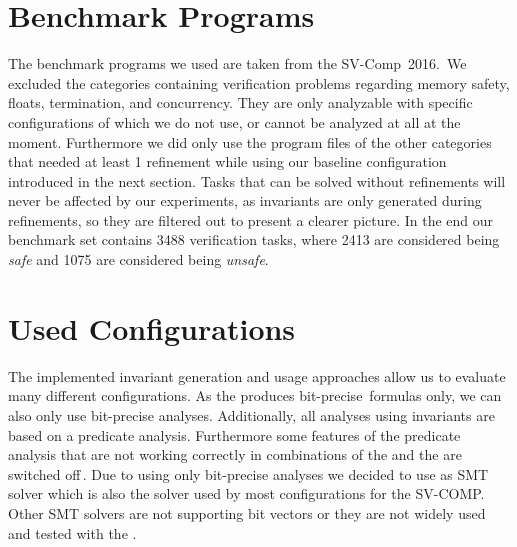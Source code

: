 \section{Benchmark Programs}
The benchmark programs we used are taken from the SV-Comp~2016.\, We excluded the categories containing verification problems regarding memory safety, floats, termination, and concurrency. They are only analyzable with specific configurations of \CPAchecker{} which we do not use, or cannot be analyzed at all at the moment. Furthermore
we did only use the program files of the other categories that needed at least 1 refinement while using our baseline configuration introduced in the next section. Tasks that
can be solved without refinements will never be affected by our experiments, as invariants are only generated during refinements, so they are filtered out to present a clearer picture. In the end our benchmark set contains \num{3488} verification tasks, where \num{2413} are considered being \emph{safe} and \num{1075} are considered being \emph{unsafe}.

\section{Used Configurations}\label{title:configs}
The implemented invariant generation and usage approaches allow us to evaluate many different configurations. As the \InvariantsCPA{} produces bit-precise\, formulas only, we can also only use
bit-precise analyses. Additionally, all analyses using invariants are based on a predicate analysis. Furthermore some features of the predicate analysis that are not working
correctly in combinations of the \PredicateCPA{} and the \InvariantsCPA{} are switched off\,. Due to using only bit-precise analyses we decided to use \MathSAT{} as \ac{SMT} solver which is also the
solver used by most \CPAchecker{} configurations for the SV-COMP. Other \ac{SMT} solvers are not supporting bit vectors or they are not widely used and tested with the \PredicateCPA{}.

